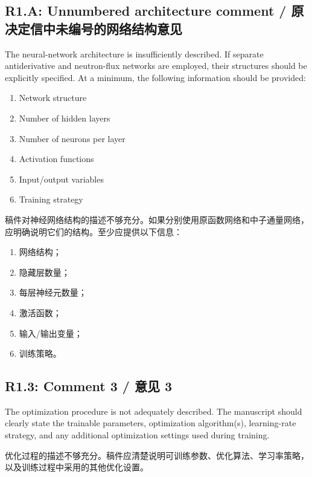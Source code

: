 \documentclass[11pt,a4paper,twoside]{article}
\begin{document}
\subsection{R1.A: Unnumbered architecture comment / 原决定信中未编号的网络结构意见}
\begin{englishcomment}
The neural-network architecture is insufficiently described. If separate antiderivative and neutron-flux networks are employed, their structures should be explicitly specified. At a minimum, the following information should be provided:
\begin{enumerate}[label=\alph*.,leftmargin=2em]
\item Network structure
\item Number of hidden layers
\item Number of neurons per layer
\item Activation functions
\item Input/output variables
\item Training strategy
\end{enumerate}
\end{englishcomment}
\begin{chinesecomment}
稿件对神经网络结构的描述不够充分。如果分别使用原函数网络和中子通量网络，应明确说明它们的结构。至少应提供以下信息：
\begin{enumerate}[label=\alph*.,leftmargin=2em]
\item 网络结构；
\item 隐藏层数量；
\item 每层神经元数量；
\item 激活函数；
\item 输入/输出变量；
\item 训练策略。
\end{enumerate}
\end{chinesecomment}
\begin{revisionidea}
\end{revisionidea}

\subsection{R1.3: Comment 3 / 意见 3}
\begin{englishcomment}
The optimization procedure is not adequately described. The manuscript should clearly state the trainable parameters, optimization algorithm(s), learning-rate strategy, and any additional optimization settings used during training.
\end{englishcomment}
\begin{chinesecomment}
优化过程的描述不够充分。稿件应清楚说明可训练参数、优化算法、学习率策略，以及训练过程中采用的其他优化设置。
\end{chinesecomment}
\begin{revisionidea}
\end{revisionidea}
\end{document}
